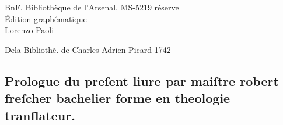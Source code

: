 \documentclass[12pt]{article}
\begin{document}
\begin{center}
  {\LARGE BnF. Bibliothèque de l'Arsenal, MS-5219 réserve}\\[2ex]
  {\Large Édition graphématique}\\[2ex]  {\large Lorenzo Paoli}
\end{center}

\newpage

\modulolinenumbers[5]   %
\linenumbers


    



\newpage
Dela Bibliothẽ. de Charles Adrien Picard
          1742





\subsection*{Prologue du preſent liure par maiſtre robert\\
freſcher bachelier forme en theologie tranſlateur.}
\end{document}
